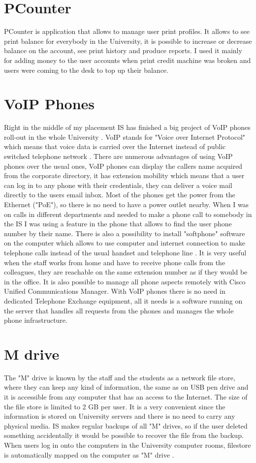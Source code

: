 \documentclass[10pt,a4paper,headinclude=true]{report}
\begin{document}
\section{PCounter}
PCounter is application that allows to  manage user print profiles. It allows to see print balance for everybody in the University, it is possible to increase or decrease balance on the account, see print history and produce reports. I used it mainly for adding money to the user accounts when print credit machine was broken and users were coming to the desk to top up their balance.

\section{VoIP Phones}
Right in the middle of my placement IS has finished a big project of VoIP phones roll-out in the whole University \cite{VoIP}. VoIP stands for "Voice over Internet Protocol" which means that voice data is carried over the Internet instead of public switched telephone network \cite{VoIP2}. There are numerous advantages of using VoIP phones over the usual ones, VoIP phones can display the callers name acquired from the corporate directory, it has extension mobility which means that a user can log in to any phone with their credentials, they can deliver a voice mail directly to the users email inbox. Most of the phones get the power from the Ethernet ("PoE"), so there is no need to have a power outlet nearby. When I was on calls in different departments and needed to make a phone call to somebody in the IS I was using a feature in the phone that allows to find the user phone number by their name. There is also a possibility to install "softphone" software on the computer which allows to use computer and internet connection to make telephone calls instead of the usual handset and telephone line \cite{VoIP3}. It is very useful when the staff works from home and have to receive phone calls from the colleagues, they are reachable on the same extension number as if they would be in the office. It is also possible to manage all phone aspects remotely with Cisco Unified Communications Manager. With VoIP phones there is no need in dedicated Telephone Exchange equipment, all it needs is a software running on the server that handles all requests from the phones and manages the whole phone infrastructure.
 
\section{M drive}
The "M" drive is known by the staff and the students as a network file store, where they can keep any kind of information, the same as on USB pen drive and it is accessible from any computer that has an access to the Internet. The size of the file store is limited to 2 GB per user.  It is a very convenient since the information is stored on University servers and there is no need to carry any physical media. IS makes regular backups of all "M" drives, so if the user deleted something accidentally it would be possible to recover the file from the backup. When users log in onto the computers in the University computer rooms, filestore is automatically mapped on the computer as "M" drive \cite{MDrive}.
\end{document}
